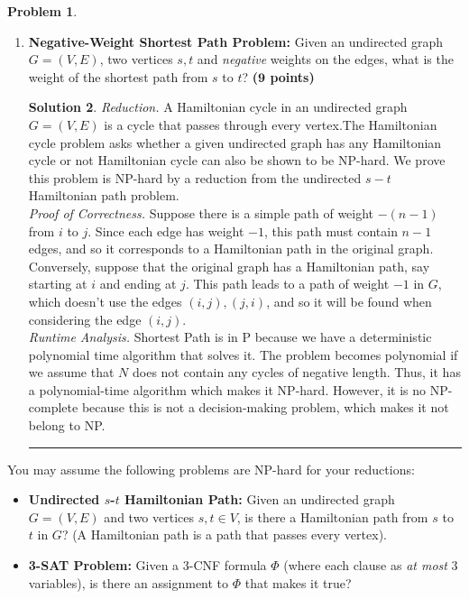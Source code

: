 \documentclass{article}
\theoremstyle{definition}
\newtheorem{problem}{Problem}
\def\fline{\rule{0.75\linewidth}{0.5pt}}
\newcommand{\finishline}{\begin{center}\fline\end{center}}
\newtheorem*{solution*}{Solution}
\newenvironment{solution}{\begin{solution*}}{{\finishline} \end{solution*}}
\newcommand{\grade}[1]{\hfill{\textbf{($\mathbf{#1}$ points)}}}
\begin{document}
\begin{problem}
\begin{enumerate}[label=(\alph*)]
\begin{solution}
	This concludes the proof of NP-hardness of the 3-SAT problem.  Given that we already proved 3-SAT is also in NP, this means 3-SAT is NP-complete. \\
	
\end{solution}

	 \item \textbf{Negative-Weight Shortest Path Problem:} Given an undirected graph $G=(V,E)$, two vertices $s,t$ and \emph{negative} weights on the edges, what is the weight of the shortest path from $s$ to $t$? \grade{9}
	 
\begin{solution}
	 
	\emph{Reduction.} A Hamiltonian cycle in an undirected graph $G= (V, E)$ is a cycle that passes through every vertex.The Hamiltonian cycle problem asks whether a given undirected graph has any Hamiltonian cycle or not Hamiltonian cycle can also be shown to be NP-hard. We prove this problem is NP-hard by a reduction from the undirected  $s-t$ Hamiltonian path problem. \\
	
	\emph{Proof of Correctness.} Suppose there is a simple path of weight $-(n-1)$ from $i$ to $j$. Since each edge has weight $-1$, this path must contain $n-1$ edges, and so it corresponds to a Hamiltonian path in the original graph. Conversely, suppose that the original graph has a Hamiltonian path, say starting at $i$ and ending at $j$. This path leads to a path of weight $-1$ in $G$, which doesn't use the edges $(i,j),(j,i)$, and so it will be found when considering the edge $(i,j)$. \\
	
	\emph{Runtime Analysis.} Shortest Path is in P because we have a deterministic polynomial time algorithm that solves it. The problem becomes polynomial if we assume that $N$ does not contain any cycles of negative length. Thus, it has a polynomial-time algorithm which makes it NP-hard. However, it is no NP-complete because this is not a decision-making problem, which makes it not belong to NP. \\	
\end{solution}

\end{enumerate}

You may assume the following problems are NP-hard for your reductions: 
\begin{itemize}
	\item \textbf{Undirected $s$-$t$ Hamiltonian Path:} Given an undirected graph $G=(V,E)$ and two vertices $s,t \in V$, is there a Hamiltonian path from $s$ to $t$ in $G$? (A Hamiltonian path is a path that passes every vertex). 
	\item \textbf{3-SAT Problem:} Given a 3-CNF formula $\Phi$  (where each clause as \emph{at most} $3$ variables), is there an assignment to $\Phi$ that makes it true?
\end{itemize}

\end{problem}
\end{document}
